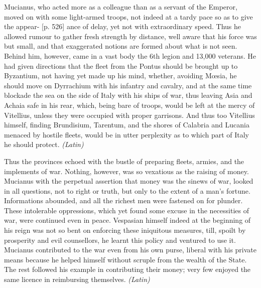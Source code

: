 
Mucianus, who acted more as a colleague than as a servant of the Emperor, moved on with some light-armed troops, not indeed at a tardy pace so as to give the appear- [p. 526] ance of delay, yet not with extraordinary speed. Thus he allowed rumour to gather fresh strength by distance, well aware that his force was but small, and that exaggerated notions are formed about what is not seen. Behind him, however, came in a vast body the 6th legion and 13,000 veterans. He had given directions that the fleet from the Pontus should be brought up to Byzantium, not having yet made up his mind, whether, avoiding Mœsia, he should move on Dyrrachium with his infantry and cavalry, and at the same time blockade the sea on the side of Italy with his ships of war, thus leaving Asia and Achaia safe in his rear, which, being bare of troops, would be left at the mercy of Vitellius, unless they were occupied with proper garrisons. And thus too Vitellius himself, finding Brundisium, Tarentum, and the shores of Calabria and Lucania menaced by hostile fleets, would be in utter perplexity as to which part of Italy he should protect. \emph{(Latin)}


Thus the provinces echoed with the bustle of preparing fleets, armies, and the implements of war. Nothing, however, was so vexatious as the raising of money. Mucianus with the perpetual assertion that money was the sinews of war, looked in all questions, not to right or truth, but only to the extent of a man's fortune. Informations abounded, and all the richest men were fastened on for plunder. These intolerable oppressions, which yet found some excuse in the necessities of war, were continued even in peace. Vespasian himself indeed at the beginning of his reign was not so bent on enforcing these iniquitous measures, till, spoilt by prosperity and evil counsellors, he learnt this policy and ventured to use it. Mucianus contributed to the war even from his own purse, liberal with his private means because he helped himself without scruple from the wealth of the State. The rest followed his example in contributing their money; very few enjoyed the same licence in reimbursing themselves. \emph{(Latin)}


